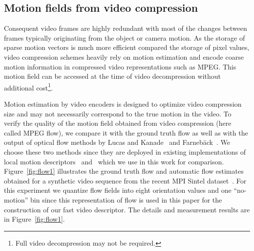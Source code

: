 \documentclass[10pt,twocolumn,letterpaper]{article}
\begin{document}
\subsection{Motion fields from video compression}
Consequent video frames are highly redundant with most of the changes between frames typically originating from the object or camera motion. As the storage of sparse motion vectors is much more efficient compared the storage of pixel values, video compression schemes heavily rely on motion estimation and encode coarse motion information in compressed video representations such as MPEG. This motion field can be accessed at the time of video decompression without additional cost\footnote{Full video decompression may not be required.}. %

Motion estimation by video encoders is designed to optimize video compression size and may not necessarily correspond to the true motion in the video. To verify the quality of the motion field obtained from video compression (here called MPEG flow), we compare it with the ground truth flow as well as with the output of optical flow methods by Lucas and Kanade~\cite{Lucas81} and Farneb\"ack~\cite{Farneback03}. We choose these two methods since they are deployed in existing implementations of local motion descriptors~\cite{Laptev08} and~\cite{Wang12} which we use in this work for comparison. Figure~\ref{fig:flow1} illustrates the ground truth flow and automatic flow estimates obtained for a synthetic video sequence from the recent MPI Sintel dataset~\cite{Butler12}. For this experiment we quantize flow fields into eight orientation values and one ``no-motion'' bin since this representation of flow is used in this paper for the construction of our fast video descriptor. The details and measurement results are in Figure~\ref{fig:flow1}.

\end{document}
